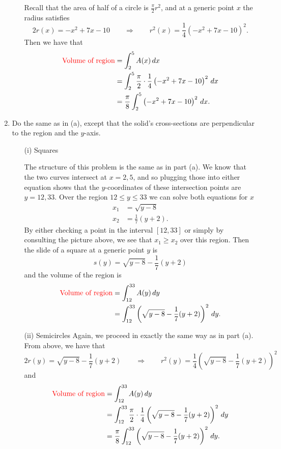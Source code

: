\documentclass[noinstructornotes]{ximera}
\begin{document}
\begin{problem}
\begin{enumerate}
\begin{enumerate}
\begin{freeResponse}
				Recall that the area of half of a circle is $\frac{\pi}{2} r^2$, and at a generic point $x$ the radius satisfies
				\[  
				2r(x) = -x^2+7x-10	\qquad	\Longrightarrow		\qquad	r^2(x) = \frac{1}{4} \left( -x^2+7x-10 \right)^2.
				\]
				Then we have that
					\begin{align*}
					\text{{\color{red} Volume of region}} &= \int_2^5 A(x) \,d x  \\
					&= \int_2^5 \frac{\pi}{2} \cdot \frac{1}{4} \left( -x^2+7x-10 \right)^2 \,d x  \\
					&= \frac{\pi}{8} \int_2^5 \left( -x^2+7x-10 \right)^2 \,d x.
					\end{align*}
				\end{freeResponse}
			\end{enumerate}
		
		\item  Do the same as in (a), except that the solid's cross-sections are perpendicular to the region and the $y$-axis.
		\begin{freeResponse}
			\begin{enumerate}
			\item[(i)] Squares
			
			The structure of this problem is the same as in part (a).  
			We know that the two curves intersect at $x=2,5$, and so plugging those into either equation shows that the $y$-coordinates of these intersection points are $y=12, 33$.  
			Over the region $12 \leq y \leq 33$ we can solve both equations for $x$
				\begin{align*}
				x_1 &= \sqrt{y-8}  \\
				x_2 &= \frac{1}{7} (y+2).
				\end{align*}
			By either checking a point in the interval $[12,33]$ or simply by consulting the picture above, we see that $x_1 \geq x_2$ over this region.  
			Then the slide of a square at a generic point $y$ is
				\[
				s(y) = \sqrt{y-8} - \frac{1}{7}(y+2)
				\]
			and the volume of the region is
				\begin{align*}
				\text{{\color{red} Volume of region}} &= \int_{12}^{33} A(y) \,d y  \\
				&= \int_{12}^{33} \left( \sqrt{y-8} - \frac{1}{7}(y+2) \right)^2 \,d y.
				\end{align*}
			
			\item[(ii)] Semicircles
			Again, we proceed in exactly the same way as in part (a).  
			From above, we have that
				\[  
				2r(y) = \sqrt{y-8} - \frac{1}{7}(y+2)	\qquad	\Longrightarrow		\qquad	r^2(y) = \frac{1}{4} \left( \sqrt{y-8} - \frac{1}{7}(y+2) \right)^2
				\]
			and
				\begin{align*}
				\text{{\color{red} Volume of region}} &= \int_{12}^{33} A(y) \,d y  \\
				&= \int_{12}^{33} \frac{\pi}{2} \cdot \frac{1}{4} \left( \sqrt{y-8} - \frac{1}{7}(y+2) \right)^2 \,d y  \\
				&= \frac{\pi}{8} \int_{12}^{33} \left( \sqrt{y-8} - \frac{1}{7}(y+2) \right)^2 \,d y.
				\end{align*}
			

\end{enumerate}
\end{freeResponse}
\end{enumerate}
\end{problem}
\end{document}
